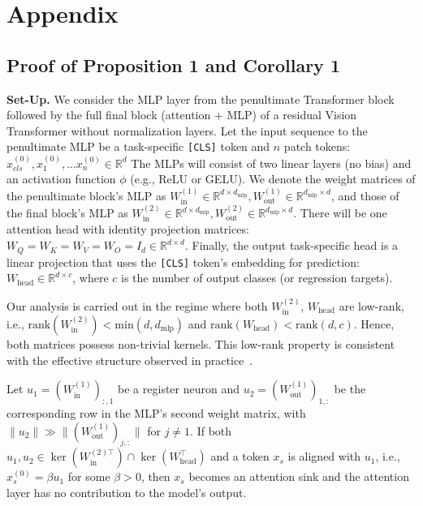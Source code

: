 \documentclass{article}
\begin{document}





\newpage
\appendix
\section{Appendix}

\subsection{Proof of Proposition 1 and Corollary 1}
\label{appendix:proof}

\textbf{Set-Up.}
We consider the MLP layer from the penultimate Transformer block followed by the full final block (attention + MLP) of a residual Vision Transformer without normalization layers. Let the input sequence to the penultimate MLP be a task-specific \texttt{[CLS]} token and $n$ patch tokens: $x^{(0)}_{cls}, x^{(0)}_1,...  x^{(0)}_n\in \mathbb{R}^{d}$ The MLPs will consist of two linear layers (no bias) and an activation function \( \phi \) (e.g., ReLU or GELU). We denote the weight matrices of the penultimate block's MLP as $W_{\text{in}}^{(1)} \in \mathbb{R}^{d \times d_{\text{mlp}}}, W_{\text{out}}^{(1)} \in \mathbb{R}^{d_{\text{mlp}} \times d}$, and those of the final block's MLP as $W_{\text{in}}^{(2)} \in \mathbb{R}^{d \times d_{\text{mlp}}}, W_{\text{out}}^{(2)} \in \mathbb{R}^{d_{\text{mlp}} \times d}$. There will be one attention head with identity projection matrices: \( W_Q = W_K = W_V = W_O = I_d \in \mathbb{R}^{d \times d} \). Finally, the output task-specific head is a linear projection that uses the \texttt{[CLS]} token's embedding for prediction: $W_{\text{head}} \in \mathbb{R}^{d \times c}$,  where \( c \) is the number of output classes (or regression targets). 

Our analysis is carried out in the regime where both $W_{\text{in}}^{(2)}$, $W_{\text{head}}$  are low-rank, i.e., $\mathrm{rank}(W_{\text{in}}^{(2)})< \mathrm{min}(d,d_{\text{mlp}})$ and
$\mathrm{rank}(W_{\text{head}})< \mathrm{rank}(d,c)$. Hence, both matrices possess non-trivial kernels. This low-rank property is consistent with the effective structure observed in practice~\citep{li2018measuring, aghajanyan2021intrinsic, hulora}.


\begingroup
\renewcommand\theproposition{1} %
\begin{proposition}
\label{prop:register_sink}
Let $u_1 = (W_{\text{in}}^{(1)})_{:, 1}$
be a register neuron and $u_2 = (W_{\text{out}}^{(1)})_{1, :}$
be the corresponding row in the MLP's second weight matrix, with $\|u_2\|
 \gg\|(W_{\text{out}}^{(1)})_{j,:}\|$ for $j \neq 1$.
If both $u_1, u_2 \in \ker(W_{\text{in}}^{(2)\top}) \cap \ker(W^\top_{\text{head}})$ and a token $x_s$ is aligned with $u_1$, i.e., $x^{(0)}_s = \beta u_1$ for some $\beta > 0$,
then $x_s$ becomes an attention sink and the attention layer has no contribution to the model's output.
\end{proposition}
\endgroup
\end{document}
